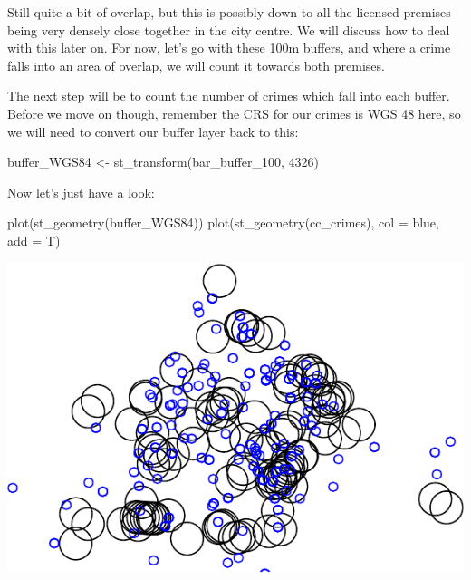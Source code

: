 \documentclass[
]{book}
\newenvironment{Shaded}{\begin{snugshade}}{\end{snugshade}}
\newcommand{\AttributeTok}[1]{\textcolor[rgb]{0.77,0.63,0.00}{#1}}
\newcommand{\DecValTok}[1]{\textcolor[rgb]{0.00,0.00,0.81}{#1}}
\newcommand{\FunctionTok}[1]{\textcolor[rgb]{0.00,0.00,0.00}{#1}}
\newcommand{\NormalTok}[1]{#1}
\newcommand{\OtherTok}[1]{\textcolor[rgb]{0.56,0.35,0.01}{#1}}
\newcommand{\StringTok}[1]{\textcolor[rgb]{0.31,0.60,0.02}{#1}}
\begin{document}
Still quite a bit of overlap, but this is possibly down to all the licensed premises being very densely close together in the city centre. We will discuss how to deal with this later on. For now, let's go with these 100m buffers, and where a crime falls into an area of overlap, we will count it towards both premises.

The next step will be to count the number of crimes which fall into each buffer. Before we move on though, remember the CRS for our crimes is WGS 48 here, so we will need to convert our buffer layer back to this:

\begin{Shaded}
\begin{Highlighting}[]
\NormalTok{buffer\_WGS84 }\OtherTok{\textless{}{-}} \FunctionTok{st\_transform}\NormalTok{(bar\_buffer\_100, }\DecValTok{4326}\NormalTok{)}
\end{Highlighting}
\end{Shaded}

Now let's just have a look:

\begin{Shaded}
\begin{Highlighting}[]
\FunctionTok{plot}\NormalTok{(}\FunctionTok{st\_geometry}\NormalTok{(buffer\_WGS84))}
\FunctionTok{plot}\NormalTok{(}\FunctionTok{st\_geometry}\NormalTok{(cc\_crimes), }\AttributeTok{col =} \StringTok{\textquotesingle{}blue\textquotesingle{}}\NormalTok{, }\AttributeTok{add =}\NormalTok{ T)}
\end{Highlighting}
\end{Shaded}

\includegraphics{crime_mapping_files/figure-latex/crimes_and_buffers-1.pdf}
\end{document}
